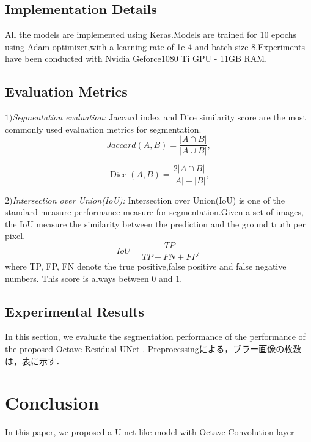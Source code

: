 \documentclass{article}
\begin{document}
\subsection{Implementation Details}
All the models are implemented using Keras.Models are trained for 10 epochs using Adam optimizer,with a learning rate of 1e-4 and batch size 8.Experiments have been conducted with Nvidia Geforce1080 Ti GPU - 11GB RAM.
\subsection{Evaluation Metrics}
\(1)\){\it Segmentation  evaluation: }Jaccard index and Dice similarity score are the most commonly used evaluation metrics for segmentation.
\begin{equation}
J a c c a r d(A, B)=\frac{|A \cap B|}{|A \cup B|},
\end{equation}

\begin{equation}
\operatorname{Dice}(A, B)=\frac{2|A \cap B|}{|A|+|B|},
\end{equation}

\(2)\){\it Intersection over Union(IoU): } Intersection over Union(IoU) is one of the standard measure performance measure for segmentation.Given a set of images, the IoU measure the similarity between the prediction and the ground truth per pixel.
\begin{equation}
IoU=\frac{TP}{TP+FN+FP},
\end{equation}
where TP, FP, FN denote the true positive,false positive and false negative numbers. This score is always between $0$ and $1$.
\subsection{Experimental Results}
In this section, we evaluate the segmentation performance of the performance of the proposed Octave Residual UNet . Preprocessingによる，ブラー画像の枚数は，表に示す．
\section{Conclusion}
\label{sec:con}
In this paper, we proposed a U-net like model with Octave Convolution layer 
\end{document}
